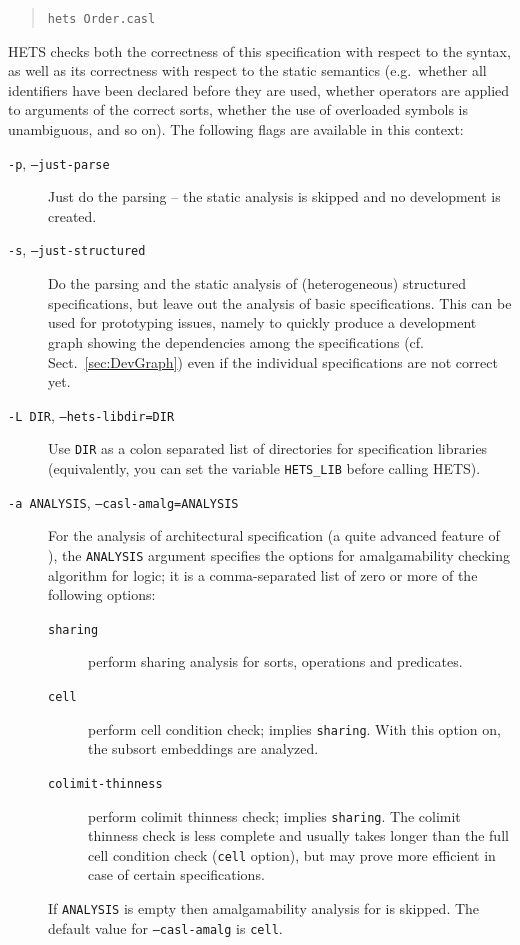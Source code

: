 \documentclass{article}
\newcommand{\normalTEXTSC}[2]{{#1\scriptsize#2}}
\newcommand     {\Hets}{\normalTEXTSC{H}{ETS}\xspace}
\begin{document}
\begin{quote}
\texttt{hets Order.casl}
\end{quote}
\Hets checks both the correctness of this specification
 with respect to the \CASL syntax, as
well as its correctness with respect to the static semantics (e.g.\
whether all identifiers have been declared before they are used,
whether operators are applied to arguments of the correct sorts,
whether the use of overloaded symbols is unambiguous, and so on).
The following flags are available in this context:
\begin{description}
\item[\texttt{-p}, \texttt{--just-parse}] Just do the parsing
 -- the static analysis is skipped and no development is created.
\item[\texttt{-s}, \texttt{--just-structured}] Do the parsing and the
  static analysis of (heterogeneous) structured specifications, but
  leave out the analysis of basic specifications.  This can be used
  for prototyping issues, namely to quickly produce a development graph
  showing the dependencies among the specifications (cf.
  Sect.~\ref{sec:DevGraph}) even if the individual specifications are
  not correct yet.
\item[\texttt{-L DIR}, \texttt{--hets-libdir=DIR}]
Use \texttt{DIR} as a colon separated list of directories for specification libraries (equivalently, you can set the variable \texttt{HETS\_LIB} before
calling \Hets).
\item[\texttt{-a ANALYSIS}, \texttt{--casl-amalg=ANALYSIS}]
  For the analysis of architectural specification (a quite advanced
  feature of \CASL), the \texttt{ANALYSIS} argument specifies the options for
  amalgamability checking
  algorithm for \CASL logic; it is a comma-separated list of zero or
  more of the following options:
  \begin{description}
  \item[\texttt{sharing}] perform sharing analysis for sorts,
    operations and predicates.
  \item[\texttt{cell}] perform cell condition check; implies
    \texttt{sharing}. With this option on, the subsort embeddings are
    analyzed.
  \item[\texttt{colimit-thinness}] perform colimit thinness check;
    implies \texttt{sharing}. The colimit thinness check is less
    complete and usually takes longer than the full cell condition
    check (\texttt{cell} option), but may prove more efficient in case
    of certain specifications.
  \end{description}
  If \texttt{ANALYSIS} is empty then amalgamability analysis for
  \CASL is skipped.
  The default value for \texttt{--casl-amalg} is
  \texttt{cell}.
\end{description}
\end{document}
